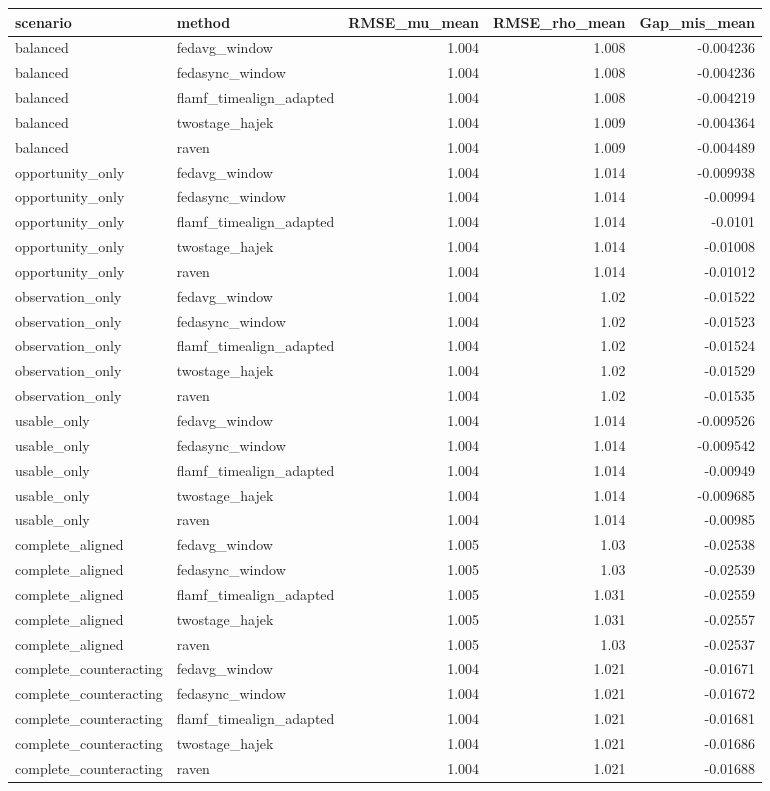 \begin{tabular}{llrrr}
\toprule
scenario & method & RMSE_mu_mean & RMSE_rho_mean & Gap_mis_mean \\
\midrule
balanced & fedavg_window & 1.004 & 1.008 & -0.004236 \\
balanced & fedasync_window & 1.004 & 1.008 & -0.004236 \\
balanced & flamf_timealign_adapted & 1.004 & 1.008 & -0.004219 \\
balanced & twostage_hajek & 1.004 & 1.009 & -0.004364 \\
balanced & raven & 1.004 & 1.009 & -0.004489 \\
opportunity_only & fedavg_window & 1.004 & 1.014 & -0.009938 \\
opportunity_only & fedasync_window & 1.004 & 1.014 & -0.00994 \\
opportunity_only & flamf_timealign_adapted & 1.004 & 1.014 & -0.0101 \\
opportunity_only & twostage_hajek & 1.004 & 1.014 & -0.01008 \\
opportunity_only & raven & 1.004 & 1.014 & -0.01012 \\
observation_only & fedavg_window & 1.004 & 1.02 & -0.01522 \\
observation_only & fedasync_window & 1.004 & 1.02 & -0.01523 \\
observation_only & flamf_timealign_adapted & 1.004 & 1.02 & -0.01524 \\
observation_only & twostage_hajek & 1.004 & 1.02 & -0.01529 \\
observation_only & raven & 1.004 & 1.02 & -0.01535 \\
usable_only & fedavg_window & 1.004 & 1.014 & -0.009526 \\
usable_only & fedasync_window & 1.004 & 1.014 & -0.009542 \\
usable_only & flamf_timealign_adapted & 1.004 & 1.014 & -0.00949 \\
usable_only & twostage_hajek & 1.004 & 1.014 & -0.009685 \\
usable_only & raven & 1.004 & 1.014 & -0.00985 \\
complete_aligned & fedavg_window & 1.005 & 1.03 & -0.02538 \\
complete_aligned & fedasync_window & 1.005 & 1.03 & -0.02539 \\
complete_aligned & flamf_timealign_adapted & 1.005 & 1.031 & -0.02559 \\
complete_aligned & twostage_hajek & 1.005 & 1.031 & -0.02557 \\
complete_aligned & raven & 1.005 & 1.03 & -0.02537 \\
complete_counteracting & fedavg_window & 1.004 & 1.021 & -0.01671 \\
complete_counteracting & fedasync_window & 1.004 & 1.021 & -0.01672 \\
complete_counteracting & flamf_timealign_adapted & 1.004 & 1.021 & -0.01681 \\
complete_counteracting & twostage_hajek & 1.004 & 1.021 & -0.01686 \\
complete_counteracting & raven & 1.004 & 1.021 & -0.01688 \\
\bottomrule
\end{tabular}
